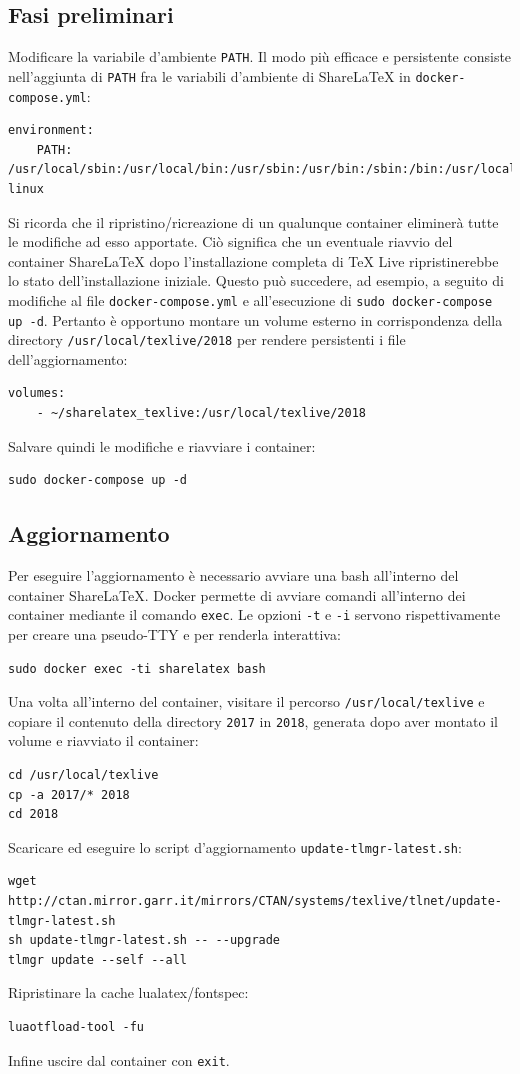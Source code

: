 \subsection{Fasi preliminari}
Modificare la variabile d'ambiente \verb|PATH|. Il modo più efficace e persistente consiste nell'aggiunta di \verb|PATH| fra le variabili d'ambiente di ShareLaTeX in \verb|docker-compose.yml|:
\begin{lstlisting}
environment:
    PATH: /usr/local/sbin:/usr/local/bin:/usr/sbin:/usr/bin:/sbin:/bin:/usr/local/texlive/2018/bin/x86_64-linux
\end{lstlisting}
Si ricorda che il ripristino/ricreazione di un qualunque container eliminerà tutte le modifiche ad esso apportate. Ciò significa che un eventuale riavvio del container ShareLaTeX dopo l'installazione completa di TeX Live ripristinerebbe lo stato dell'installazione iniziale. Questo può succedere, ad esempio, a seguito di modifiche al file \verb|docker-compose.yml| e all'esecuzione di \verb|sudo docker-compose up -d|. Pertanto è opportuno montare un volume esterno in corrispondenza della directory \verb|/usr/local/texlive/2018| per rendere persistenti i file dell'aggiornamento:
\begin{lstlisting}
volumes:
    - ~/sharelatex_texlive:/usr/local/texlive/2018
\end{lstlisting}
Salvare quindi le modifiche e riavviare i container:
\begin{lstlisting}
sudo docker-compose up -d
\end{lstlisting}

\subsection{Aggiornamento}
Per eseguire l'aggiornamento è necessario avviare una bash all'interno del container ShareLaTeX. Docker permette di avviare comandi all'interno dei container mediante il comando \verb|exec|. Le opzioni \verb|-t| e \verb|-i| servono rispettivamente per creare una pseudo-TTY e per renderla interattiva:
\begin{lstlisting}
sudo docker exec -ti sharelatex bash
\end{lstlisting}
Una volta all'interno del container, visitare il percorso \verb|/usr/local/texlive| e copiare il contenuto della directory \verb|2017| in \verb|2018|, generata dopo aver montato il volume e riavviato il container:
\begin{lstlisting}
cd /usr/local/texlive
cp -a 2017/* 2018
cd 2018
\end{lstlisting}
Scaricare ed eseguire lo script d'aggiornamento \verb|update-tlmgr-latest.sh|:
\begin{lstlisting}
wget http://ctan.mirror.garr.it/mirrors/CTAN/systems/texlive/tlnet/update-tlmgr-latest.sh
sh update-tlmgr-latest.sh -- --upgrade
tlmgr update --self --all
\end{lstlisting}
Ripristinare la cache lualatex/fontspec:
\begin{lstlisting}
luaotfload-tool -fu
\end{lstlisting}
Infine uscire dal container con \verb|exit|.

